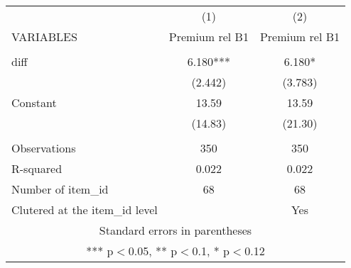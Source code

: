 \documentclass[]{article}
\begin{document}
\begin{tabular}{lcc} \hline
 & (1) & (2) \\
VARIABLES & Premium rel B1 & Premium rel B1 \\ \hline
 &  &  \\
diff & 6.180*** & 6.180* \\
 & (2.442) & (3.783) \\
Constant & 13.59 & 13.59 \\
 & (14.83) & (21.30) \\
 &  &  \\
Observations & 350 & 350 \\
R-squared & 0.022 & 0.022 \\
Number of item\_id & 68 & 68 \\
 Clutered at the item\_id level &  & Yes \\ \hline
\multicolumn{3}{c}{ Standard errors in parentheses} \\
\multicolumn{3}{c}{ *** p$<$0.05, ** p$<$0.1, * p$<$0.12} \\
\end{tabular}
\end{document}
